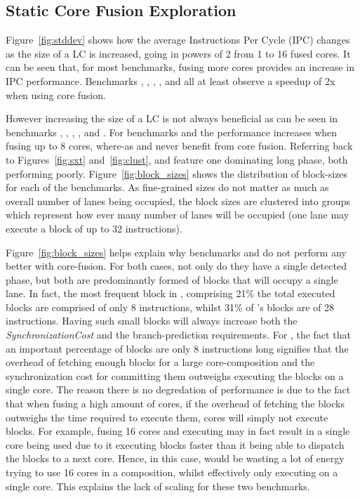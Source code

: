 \subsection{Static Core Fusion Exploration}

Figure~\ref{fig:stddev} shows how the average Instructions Per Cycle (IPC) changes as the size of a LC is increased, going in powers of 2 from 1 to 16 fused cores.
It can be seen that, for most benchmarks, fusing more cores provides an increase in IPC performance.
Benchmarks , , , ,  and  all at least observe a speedup of 2x when using core fusion.

However increasing the size of a LC is not always beneficial as can be seen in benchmarks , , , , and .
For benchmarks  and  the performance increases when fusing up to 8 cores, where-as  and  never benefit from core fusion. 
Referring back to Figures~\ref{fig:sxt} and~\ref{fig:clust},  and  feature one dominating long phase, both performing poorly.
Figure~\ref{fig:block_sizes} shows the distribution of block-sizes for each of the benchmarks.
As fine-grained sizes do not matter as much as overall number of lanes being occupied, the block sizes are clustered into groups which represent how ever many number of lanes will be occupied (one lane may execute a block of up to 32 instructions).

Figure~\ref{fig:block_sizes} helps explain why benchmarks  and  do not perform any better with core-fusion.
For both cases, not only do they have a single detected phase, but both are predominantly formed of blocks that will occupy a single lane.
In fact, the most frequent block in , comprising 21\% the total executed blocks are comprised of only 8 instructions, whilst 31\% of 's blocks are of 28 instructions.
Having such small blocks will always increase both the \textit{SynchronizationCost} and the branch-prediction requirements.
For , the fact that an important percentage of blocks are only 8 instructions long signifies that the overhead of fetching enough blocks for a large core-composition and the synchronization cost for committing them outweighs executing the blocks on a single core.
The reason there is no degredation of performance is due to the fact that when fusing a high amount of cores, if the overhead of fetching the blocks outweighs the time required to execute them, cores will simply not execute blocks.
For example, fusing 16 cores and executing  may in fact result in a single core being used due to it executing blocks faster than it being able to dispatch the blocks to a next core.
Hence, in this case,  would be wasting a lot of energy trying to use 16 cores in a composition, whilst effectively only executing on a single core. 
This explains the lack of scaling for these two benchmarks.

